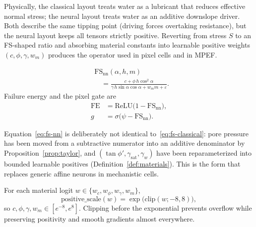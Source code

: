 Physically, the classical layout treats water as a lubricant that reduces effective normal stress; the neural layout treats water as an additive downslope driver. Both describe the same tipping point (driving forces overtaking resistance), but the neural layout keeps all tensors strictly positive. Reverting from stress \(S\) to an FS-shaped ratio and absorbing material constants into learnable positive weights \((c,\phi,\gamma,w_m)\) produces the operator used in pixel cells and in MPEF.

\begin{definition}
\label{def:fs-nn}
\begin{equation}
\label{eq:fs-nn}
\begin{split}
&\mathrm{FS}_{\mathrm{nn}}(\alpha,h,m)\\
&\quad=
\frac{c+\phi\, h\cos^{2}\alpha}
{\gamma\, h\sin\alpha\cos\alpha
+w_m m+\varepsilon}.
\end{split}
\end{equation}
Failure energy and the pixel gate are
\begin{equation}
\label{eq:fe-gate}
\begin{aligned}
\mathrm{FE}&=\mathrm{ReLU}\bigl(1-\mathrm{FS}_{\mathrm{nn}}\bigr),\\
g&=\sigma\bigl(\psi-\mathrm{FS}_{\mathrm{nn}}\bigr).
\end{aligned}
\end{equation}
\end{definition}

Equation~\eqref{eq:fs-nn} is deliberately not identical to~\eqref{eq:fs-classical}: pore pressure has been moved from a subtractive numerator into an additive denominator by Proposition~\ref{prop:taylor}, and \((\tan\phi',\gamma_{\mathrm{sat}},\gamma_w)\) have been reparameterized into bounded learnable positives (Definition~\ref{def:materials}). This is the form that replaces generic affine neurons in mechanistic cells.

\begin{definition}
\label{def:materials}
For each material logit \(w\in\{w_c,w_\phi,w_\gamma,w_m\}\),
\begin{equation}
\label{eq:positive-scale}
\mathrm{positive\_scale}(w)
=\exp\bigl(\mathrm{clip}(w;-8,8)\bigr),
\end{equation}
so \(c,\phi,\gamma,w_m\in[e^{-8},e^{8}]\). Clipping before the exponential prevents overflow while preserving positivity and smooth gradients almost everywhere.
\end{definition}

